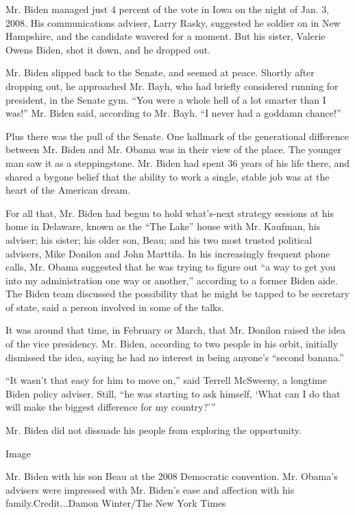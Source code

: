 Mr. Biden managed just 4 percent of the vote in Iowa on the night of
Jan. 3, 2008. His communications adviser, Larry Rasky, suggested he
soldier on in New Hampshire, and the candidate wavered for a moment. But
his sister, Valerie Owens Biden, shot it down, and he dropped out.

Mr. Biden slipped back to the Senate, and seemed at peace. Shortly after
dropping out, he approached Mr. Bayh, who had briefly considered running
for president, in the Senate gym. ``You were a whole hell of a lot
smarter than I was!'' Mr. Biden said, according to Mr. Bayh. ``I never
had a goddamn chance!''

Plus there was the pull of the Senate. One hallmark of the generational
difference between Mr. Biden and Mr. Obama was in their view of the
place. The younger man saw it as a steppingstone. Mr. Biden had spent 36
years of his life there, and shared a bygone belief that the ability to
work a single, stable job was at the heart of the American dream.

For all that, Mr. Biden had begun to hold what's-next strategy sessions
at his home in Delaware, known as the ``The Lake'' house with Mr.
Kaufman, his adviser; his sister; his older son, Beau; and his two most
trusted political advisers, Mike Donilon and John Marttila. In his
increasingly frequent phone calls, Mr. Obama suggested that he was
trying to figure out ``a way to get you into my administration one way
or another,'' according to a former Biden aide. The Biden team discussed
the possibility that he might be tapped to be secretary of state, said a
person involved in some of the talks.

It was around that time, in February or March, that Mr. Donilon raised
the idea of the vice presidency. Mr. Biden, according to two people in
his orbit, initially dismissed the idea, saying he had no interest in
being anyone's ``second banana.''

``It wasn't that easy for him to move on,'' said Terrell McSweeny, a
longtime Biden policy adviser. Still, ``he was starting to ask himself,
`What can I do that will make the biggest difference for my country?'''

Mr. Biden did not dissuade his people from exploring the opportunity.

Image

Mr. Biden with his son Beau at the 2008 Democratic convention. Mr.
Obama's advisers were impressed with Mr. Biden's ease and affection with
his family.Credit...Damon Winter/The New York Times

